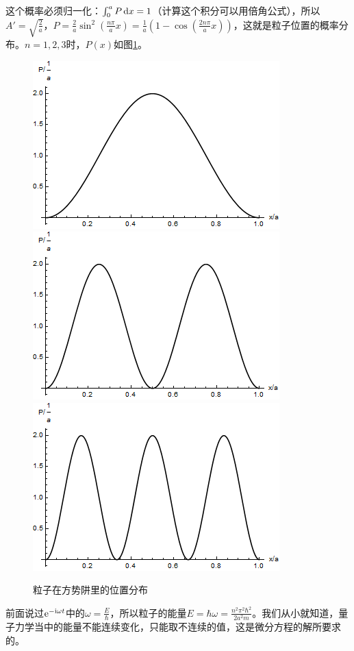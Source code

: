 这个概率必须归一化：$\int_0^a P \mathop{}\!\mathrm{d} x=1$（计算这个积分可以用倍角公式），所以$A'=\sqrt{\frac{2}{a}}$，$P=\frac{2}{a} \sin^2 (\frac{n \pi}{a} x)=\frac{1}{a} (1-\cos(\frac{2 n \pi}{a} x))$，这就是粒子位置的概率分布。$n=1,2,3$时，$P(x)$如图\ref{fig-square-well}。
\begin{figure}[htb]
\centering
\includegraphics[scale=0.4]{fig/square-well.png}
\includegraphics[scale=0.4]{fig/square-well-2.png}
\includegraphics[scale=0.4]{fig/square-well-3.png}
\caption{粒子在方势阱里的位置分布}
\label{fig-square-well}
\end{figure}

前面说过$\mathrm{e}^{-\mathrm{i} \omega t}$中的$\omega=\frac{E}{\hbar}$，所以粒子的能量$E=\hbar \omega=\frac{n^2 \pi^2 \hbar^2}{2 a^2 m}$。我们从小就知道，量子力学当中的能量不能连续变化，只能取不连续的值，这是微分方程的解所要求的。

